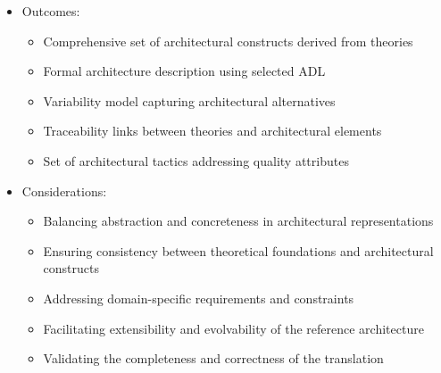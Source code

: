 \documentclass[12pt,a4paper]{article}
\begin{document}
\begin{itemize}
\begin{itemize}
    \end{itemize}
    \item Outcomes:
    \begin{itemize}
        \item Comprehensive set of architectural constructs derived from theories
        \item Formal architecture description using selected ADL
        \item Variability model capturing architectural alternatives
        \item Traceability links between theories and architectural elements
        \item Set of architectural tactics addressing quality attributes
    \end{itemize}
    \item Considerations:
    \begin{itemize}
        \item Balancing abstraction and concreteness in architectural representations
        \item Ensuring consistency between theoretical foundations and architectural constructs
        \item Addressing domain-specific requirements and constraints
        \item Facilitating extensibility and evolvability of the reference architecture
        \item Validating the completeness and correctness of the translation
    \end{itemize}
\end{itemize}
\end{document}
